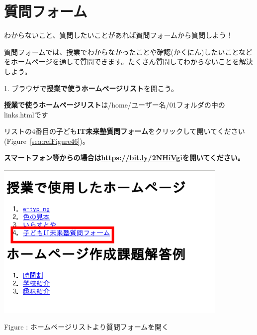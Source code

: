 \documentclass[a4paper,12pt]{jarticle}
\newcounter{Figure}
\renewcommand\theFigure{\arabic{Figure}}
\begin{document}
\bigskip
\bigskip
\bigskip




\clearpage\section{質問フォーム}
わからないこと、質問したいことがあれば質問フォームから質問しよう！

質問フォームでは、授業でわからなかったことや確認(かくにん)したいことなどをホームページを通して質問できます。たくさん質問してわからないことを解決しよう。

\bigskip

\bigskip

1.
ブラウザで\textbf{授業で使うホームページリスト}を開こう。

\bigskip

\textbf{授業で使うホームページリスト}は/home/ユーザー名/01フォルダの中のlinks.htmlです

リストの4番目の子ども\textbf{IT未来塾質問フォーム}をクリックして開いてください(Figure~\ref{seq:refFigure46})。


\bigskip

{\bfseries
スマートフォン等からの場合は\url{https://bit.ly/2NHiVgi}を開いてください。}



\begin{minipage}{9.781cm}
\centering
{\upshape
\includegraphics[width=11.231cm,height=7.613cm]{textbook-img245.png}
\flushleft

\bigskip
Figure {\theFigure\label{seq:refFigure46}}:
ホームページリストより質問フォームを開く}
\end{minipage}

\bigskip
\end{document}
